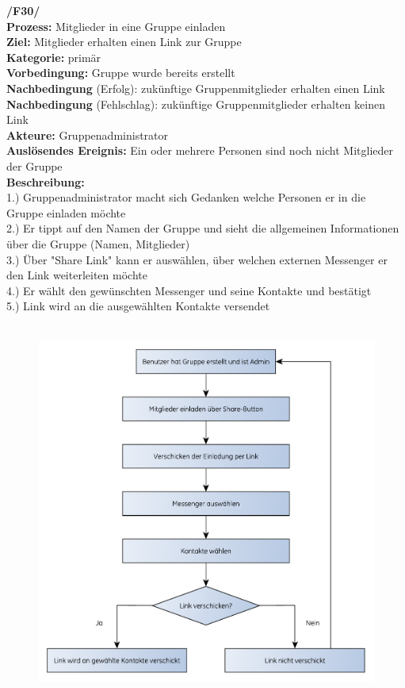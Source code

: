 \textbf{/F30/} \\
\textbf{Prozess:} Mitglieder in eine Gruppe einladen\\
\textbf{Ziel:} Mitglieder erhalten einen Link zur Gruppe\\
\textbf{Kategorie:} primär\\
\textbf{Vorbedingung:} Gruppe wurde bereits erstellt\\
\textbf{Nachbedingung} (Erfolg): zukünftige Gruppenmitglieder erhalten einen Link\\
\textbf{Nachbedingung} (Fehlschlag): zukünftige Gruppenmitglieder erhalten keinen Link\\
\textbf{Akteure:} Gruppenadministrator\\
\textbf{Auslösendes Ereignis:} Ein oder mehrere Personen sind noch nicht Mitglieder der Gruppe\\
\textbf{Beschreibung:}\\
1.) Gruppenadministrator macht sich Gedanken welche Personen er in die Gruppe einladen möchte\\
2.) Er tippt auf den Namen der Gruppe und sieht die allgemeinen Informationen über die Gruppe (Namen, Mitglieder)\\
3.) Über "Share Link" kann er auswählen, über welchen externen Messenger er den Link weiterleiten möchte\\
4.) Er wählt den gewünschten Messenger und seine Kontakte und bestätigt\\
5.) Link wird an die ausgewählten Kontakte versendet\\
\\

\begin{figure} [H]
	\centering
	\includegraphics[scale=0.7]{./res/F30_mitglieder_einladen_flowgraph.pdf}
\end{figure}

